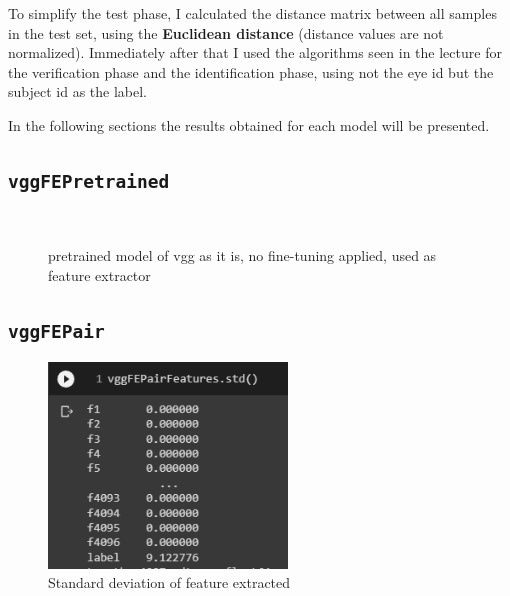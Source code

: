 \documentclass{article}
\begin{document}
To simplify the test phase, I calculated the distance matrix between all samples in the test set, using the \textbf{Euclidean distance} (distance values are not normalized). Immediately after that I used the algorithms seen in the lecture for the verification phase and the identification phase, using not the eye id but the subject id as the label. 

\bigskip
In the following sections the results obtained for each model will be presented.

\subsection{\texttt{vggFEPretrained}}
\begin{figure}[H]
    \centering
    \\
    \caption{pretrained model of vgg as it is, no fine-tuning applied, used as feature extractor}
    \label{fig:vggFEPretrainedRes}
\end{figure}

\subsection{\texttt{vggFEPair}}

\begin{figure}[H]
    \centering
    \includegraphics[width=2.5in]{imgs/vggFEPairStd.PNG}
    \caption{Standard deviation of feature extracted}
    \label{fig:vggFEPairStd}
\end{figure}
\end{document}
